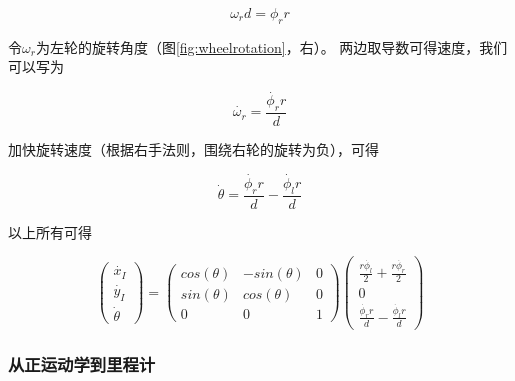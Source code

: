 \begin{equation}
\omega_r d = \phi_r r
\end{equation}

令$\omega_r$为左轮的旋转角度（图\ref {fig:wheelrotation}，右）。 两边取导数可得速度，我们可以写为

\begin{equation}
\dot{\omega_r} = \frac{\dot{\phi_r} r}{d}
\end{equation}


加快旋转速度（根据右手法则，围绕右轮的旋转为负），可得

\begin{equation}
\dot{\theta}=\frac{\dot{\phi_r} r}{d}-\frac{\dot{\phi_l} r}{d}
\end{equation}

以上所有可得

\begin{equation}\label{eq:diffwheels}
\left(\begin{array}{c} \dot{x_I}\\\dot{y_I}\\\dot{\theta}\end{array}\right)=\left(\begin{array}{ccc}
cos(\theta) & -sin(\theta) & 0 \\
sin(\theta) & cos(\theta) & 0 \\
0 & 0 & 1\end{array}\right)\left(\begin{array}{c}\frac{r\dot{\phi_l}}{2}+\frac{r\dot{\phi_r}}{2}\\0\\\frac{\dot{\phi_r} r}{d}-\frac{\dot{\phi_l} r}{d}\end{array}\right)
\end{equation}

\subsubsection{从正运动学到里程计}

